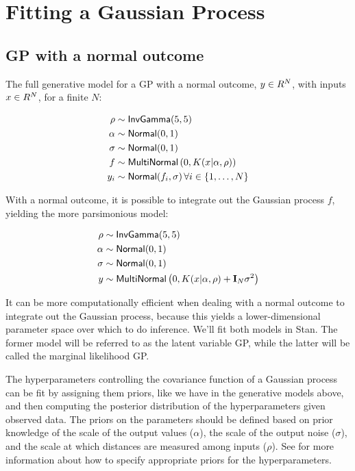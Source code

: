 \section{Fitting a Gaussian Process}\label{fit-gp.section}

\subsection{GP with a normal outcome}

The full generative model for a GP with a normal outcome,
$y \in R^N$, with inputs $x \in R^N$, for a finite $N$:

\begin{align*}
  \rho & \sim \mbox{\sf InvGamma}(5, 5) \\
  \alpha & \sim \mbox{\sf Normal}(0, 1) \\
  \sigma & \sim \mbox{\sf Normal}(0, 1) \\
  f & \sim \mbox{\sf MultiNormal}\left(0, K(x | \alpha, \rho)\right) \\
  y_i & \sim \mbox{\sf Normal}(f_i, \sigma) \, \forall i \in \{1, \dots, N\}
\end{align*}

With a normal outcome, it is possible to integrate out the Gaussian
process $f$, yielding the more parsimonious model:

\begin{align*}
  \rho & \sim \mbox{\sf InvGamma}(5, 5) \\
  \alpha & \sim \mbox{\sf Normal}(0, 1) \\
  \sigma & \sim \mbox{\sf Normal}(0, 1) \\
  y & \sim \mbox{\sf MultiNormal}
  \left(0, K(x | \alpha, \rho) + \mathbf{I}_N \sigma^2\right) \\
\end{align*}

It can be more computationally efficient when dealing with a normal
outcome to integrate out the Gaussian process, because this yields a
lower-dimensional parameter space over which to do inference. We'll fit
both models in Stan. The former model will be referred to as the latent
variable GP, while the latter will be called the marginal likelihood
GP.

The hyperparameters controlling the covariance function of a Gaussian process
can be fit by assigning them priors, like we have in the generative models
above, and then computing the posterior distribution of the hyperparameters
given observed data. The priors on the parameters should be defined
based on prior knowledge of the scale of the output values ($\alpha$), the
scale of the output noise ($\sigma$), and the scale at which distances are
measured among inputs ($\rho$). See  for more information
about how to specify appropriate priors for the hyperparameters.

